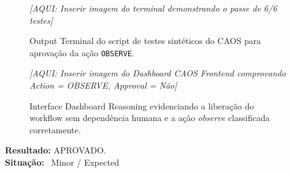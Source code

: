 \documentclass[11pt,a4paper]{article}
\begin{document}
\begin{figure}[H]
    \centering
    \textit{[AQUI: Inserir imagem do terminal demonstrando o passe de 6/6 testes]}
    \caption{Output Terminal do script de testes sintéticos do CAOS para aprovação da ação \texttt{OBSERVE}.}
    \label{fig:terminal_pass}
\end{figure}

\vspace{1cm}

\begin{figure}[H]
    \centering
    \textit{[AQUI: Inserir imagem do Dashboard CAOS Frontend comprovando Action = OBSERVE, Approval = Não]}
    \caption{Interface Dashboard Reasoning evidenciando a liberação do workflow sem dependência humana e a ação \textit{observe} classificada corretamente.}
    \label{fig:frontend_approve}
\end{figure}

\vspace{1cm}

\begin{statusbox}
\textbf{Resultado:} APROVADO.\\
\textbf{Situação:} \checkmark\ Minor / Expected 
\end{statusbox}
\end{document}
